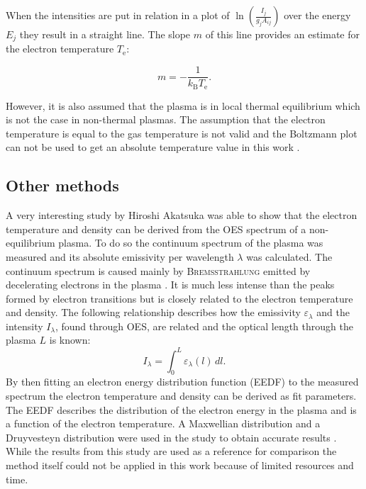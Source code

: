 When the intensities are put in relation in a plot of $ \ln \left( \frac{I_j}{g_j A_{ij}} \right) $ over the energy $ E_j $ they result in a straight line. The slope $ m $ of this line provides an estimate for the electron temperature $ T_\text{e} $:

\begin{equation}
    m = - \frac{1}{k_\text{B} T_\text{e}}.
\end{equation}

However, it is also assumed that the plasma is in local thermal equilibrium which is not the case in non-thermal plasmas. The assumption that the electron temperature is equal to the gas temperature is not valid and the Boltzmann plot can not be used to get an absolute temperature value in this work \cite{plasma2}. 

\subsection{Other methods}
\label{sec:oes_temperature}
A very interesting study by Hiroshi Akatsuka \cite{oes_temperature} was able to show that the electron temperature and density can be derived from the OES spectrum of a non-equilibrium plasma. To do so the continuum spectrum of the plasma was measured and its absolute emissivity per wavelength $\lambda$ was calculated. The continuum spectrum is caused mainly by \textsc{Bremsstrahlung} emitted by decelerating electrons in the plasma \cite{oes_temperature}. It is much less intense than the peaks formed by electron transitions but is closely related to the electron temperature and density. The following relationship describes how the emissivity $\varepsilon_\lambda$ and the intensity $I_\lambda$, found through OES, are related and the optical length through the plasma $L$ is known:
\begin{equation}
I_\lambda = \int_0^L \varepsilon_\lambda(l) \, dl.
\end{equation}
By then fitting an electron energy distribution function (EEDF) to the measured spectrum the electron temperature and density can be derived as fit parameters. The EEDF describes the distribution of the electron energy in the plasma and is a function of the electron temperature. A Maxwellian distribution and a Druyvesteyn distribution were used in the study to obtain accurate results \cite{oes_temperature}. While the results from this study are used as a reference for comparison the method itself could not be applied in this work because of limited resources and time.  

